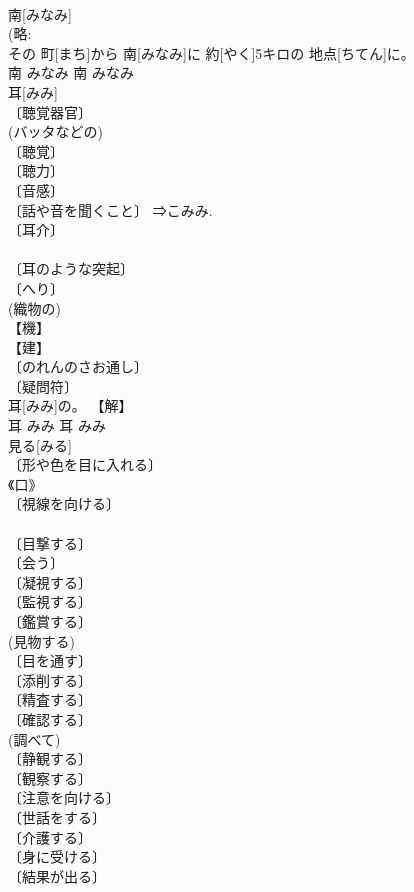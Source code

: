 \documentclass[8pt]{extreport}
\begin{document}
\begin{CJK}{UTF8}{min}
\\	南[みなみ]	
\\	(略: 
\\	その 町[まち]から 南[みなみ]に 約[やく]5キロの 地点[ちてん]に。	
\\	南	みなみ	南	みなみ	
\\	耳[みみ]	
\\	〔聴覚器官〕 
\\	(バッタなどの) 
\\	〔聴覚〕 
\\	〔聴力〕 
\\	〔音感〕 
\\	〔話や音を聞くこと〕 ⇒こみみ. 
\\	〔耳介〕 
\\	[⇒みみたぶ, みみばね] 
\\	〔耳のような突起〕 
\\	〔へり〕 
\\	(織物の) 
\\	【機】 
\\	【建】 
\\	〔のれんのさお通し〕 
\\	〔疑問符〕 
\\	耳[みみ]の。	【解】 
\\	耳	みみ	耳	みみ	
\\	見る[みる]	
\\	〔形や色を目に入れる〕 
\\	《口》 
\\	〔視線を向ける〕 
\\	[⇒みるからに, みるめ１] 
\\	〔目撃する〕 
\\	〔会う〕 
\\	〔凝視する〕 
\\	〔監視する〕 
\\	〔鑑賞する〕 
\\	(見物する) 
\\	〔目を通す〕 
\\	〔添削する〕 
\\	〔精査する〕 
\\	〔確認する〕 
\\	(調べて) 
\\	〔静観する〕 
\\	〔観察する〕 
\\	〔注意を向ける〕 
\\	〔世話をする〕 
\\	〔介護する〕 
\\	〔身に受ける〕 
\\	〔結果が出る〕 

\end{CJK}
\end{document}
